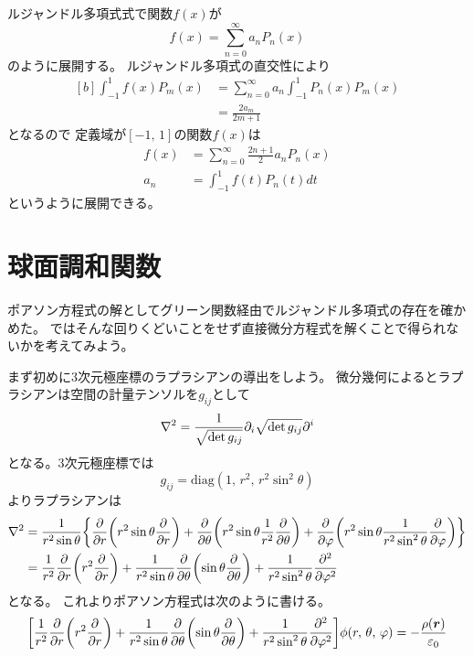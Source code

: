\documentclass[../master.tex]{subfiles}
\begin{document}
ルジャンドル多項式式で関数\(f(x)\)が
\begin{equation}
	f(x) = \sum_{n=0}^{\infty} a_n P_n(x)
\end{equation}
のように展開する。
ルジャンドル多項式の直交性により
\begin{equation}\begin{aligned}[b]
    \int_{-1}^{1}f(x) P_m(x) & = \sum_{n=0}^{\infty} a_n \int_{-1}^{1} P_n(x) P_m(x) \\
	                         & = \frac{2a_m}{2m+1}
\end{aligned}\end{equation}
となるので
定義域が\([-1,\,1]\)の関数\(f(x)\)は
\begin{align}
	f(x) & = \sum_{n=0}^{\infty} \frac{2n+1}{2}a_n P_n(x) \\
	a_n  & =\int_{-1}^{1}f(t)P_n(t) dt
\end{align}
というように展開できる。

\section{球面調和関数}
ポアソン方程式の解としてグリーン関数経由でルジャンドル多項式の存在を確かめた。
ではそんな回りくどいことをせず直接微分方程式を解くことで得られないかを考えてみよう。

まず初めに3次元極座標のラプラシアンの導出をしよう。
微分幾何によるとラプラシアンは空間の計量テンソルを\(g_{ij}\)として
\begin{equation}
	\laplacian = \frac{1}{\sqrt{\det g_{ij}}}\partial_i \sqrt{\det g_{ij}}\partial^i
\end{equation}
となる。3次元極座標では
\begin{equation}
	g_{ij} = \text{diag}(1,\,r^2,\,r^2\sin^2\theta)
\end{equation}
よりラプラシアンは
\begin{equation}\begin{aligned}[b]
    \laplacian & = \frac{1}{r^2\sin\theta}\qty{
		\pdv{r}\qty(r^2\sin\theta\pdv{r})
		+\pdv{\theta}\qty(r^2\sin\theta \frac{1}{r^2}\pdv{\theta})
		+\pdv{\varphi}\qty(r^2\sin\theta \frac{1}{r^2\sin^2\theta}\pdv{\varphi})
	}                                                   \\
	           & = \frac{1}{r^2}\pdv{r}\qty(r^2\pdv{r})
	+ \frac{1}{r^2\sin\theta}\pdv{\theta}\qty(\sin\theta\pdv{\theta})
	+ \frac{1}{r^2\sin^2\theta}\pdv[2]{\varphi}
\end{aligned}\end{equation}
となる。
これよりポアソン方程式は次のように書ける。
\begin{equation}
	\qty[\frac{1}{r^2}\pdv{r}\qty(r^2\pdv{r})
		+ \frac{1}{r^2\sin\theta}\pdv{\theta}\qty(\sin\theta\pdv{\theta})
		+ \frac{1}{r^2\sin^2\theta}\pdv[2]{\varphi}] \phi(r,\,\theta,\,\varphi)
	= -\frac{\rho(\vb*{r})}{\varepsilon_0}
\end{equation}
\end{document}
